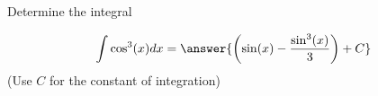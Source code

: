 \documentclass{ximera}
\author{Jason Miller}
\begin{document}
\begin{exercise}
Determine the integral

\[
\int \cos^{3}(x) dx= \answer{  \left( \sin(x) -\frac{ \sin^{3}(x)}{3} \right)   +C  }
\]
(Use $C$ for the constant of integration)

\end{exercise}
\end{document}
